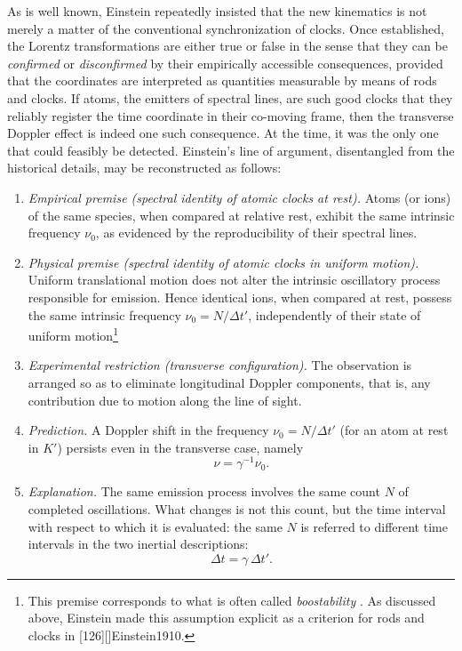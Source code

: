 \documentclass[submitted,12pt]{article}
\newcommand{\tDe}{transverse Doppler effect\xspace}
\begin{document}
As is well known, Einstein repeatedly insisted that the new kinematics is not merely a matter of the conventional synchronization of clocks. Once established, the Lorentz transformations are either true or false in the sense that they can be \emph{confirmed} or \emph{disconfirmed} by their empirically accessible consequences, provided that the coordinates are interpreted as quantities measurable by means of  rods and clocks. If atoms, the emitters of spectral lines, are such good clocks that they reliably register the time coordinate in their co-moving frame, then the \tDe is indeed one such consequence. At the time, it was the only one that could feasibly be detected. Einstein’s line of argument, disentangled from the historical details, may be reconstructed as follows:
%
\begin{enumerate}
\item \emph{Empirical premise (spectral identity of atomic clocks at rest).}  
Atoms (or ions) of the same species, when compared at relative rest, exhibit the same intrinsic frequency $\nu_0$, as evidenced by the reproducibility of their spectral lines.

\item \emph{Physical premise (spectral identity of atomic clocks in uniform motion).} Uniform translational motion does not alter the intrinsic oscillatory process responsible for emission. Hence identical ions, when compared at rest, possess the same intrinsic frequency \(\nu_0=N/\Delta t'\), independently of their state of uniform motion\footnote{This premise corresponds to what is often called \emph{boostability} \citep[30, 81, 121]{Brown2005}. As discussed above, Einstein made this assumption explicit as a criterion for  rods and clocks in [126][]{Einstein1910}.}

\item \emph{Experimental restriction (transverse configuration).}  
The observation is arranged so as to eliminate longitudinal Doppler components, that is, any contribution due to motion along the line of sight.

\item \emph{Prediction.}  
A Doppler shift in the frequency $\nu_0=N/\Delta t'$ (for an atom at rest in $K'$) persists even in the transverse case, namely
\[
\nu = \gamma^{-1}\nu_0 .
\]

\item \emph{Explanation.}
The same emission process involves the same count \(N\) of completed oscillations. What changes is not this count, but the time interval with respect to which it is evaluated: the same \(N\) is referred to different time intervals in the two inertial descriptions:
\[
\Delta t = \gamma\,\Delta t'.
\]
\end{enumerate}
\end{document}
